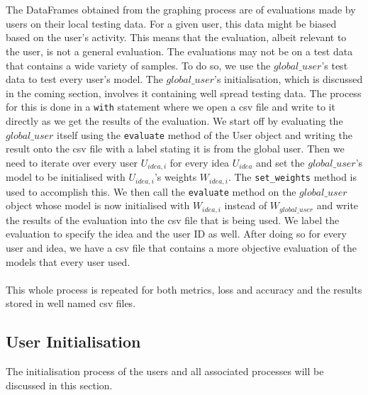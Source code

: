 \documentclass[12pt]{article}
\begin{document}
\\\\
The DataFrames obtained from the graphing process are of evaluations made by users on their local testing data. For a given user, this data might be biased based on the user's activity. This means that the evaluation, albeit relevant to the user, is not a general evaluation. The evaluations may not be on a test data that contains a wide variety of samples. To do so, we use the $global\_user$'s test data to test every user's model. The $global\_user$'s initialisation, which is discussed in the coming section, involves it containing well spread testing data. The process for this is done in a \texttt{with} statement where we open a csv file and write to it directly as we get the results of the evaluation. We start off by evaluating the $global\_user$ itself using the \texttt{evaluate} method of the User object and writing the result onto the csv file with a label stating it is from the global user. Then we need to iterate over every user $U_{idea,i}$ for every idea $U_{idea}$ and set the $global\_user$'s model to be initialised with $U_{idea,i}$'s weights $W_{idea,i}$. The \texttt{set\_weights} method is used to accomplish this. We then call the \texttt{evaluate} method on the $global\_user$ object whose model is now initialised with $W_{idea,i}$ instead of $W_{global\_user}$ and write the results of the evaluation into the csv file that is being used. We label the evaluation to specify the idea and the user ID as well. After doing so for every user and idea, we have a csv file that contains a more objective evaluation of the models that every user used. 
\\\\
This whole process is repeated for both metrics, loss and accuracy and the results stored in well named csv files. 
\subsection{User Initialisation}
The initialisation process of the users and all associated processes will be discussed in this section.
\end{document}
